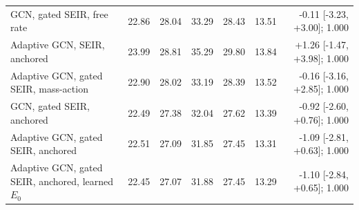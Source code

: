 \begin{table}[t]
\begin{tabular}{@{}p{2.5in}rrrrrr@{}}
GCN, gated SEIR, free rate & 22.86 & 28.04 & 33.29 & 28.43 & 13.51 & -0.11 [-3.23, +3.00]; 1.000 \\ %

Adaptive GCN, SEIR, anchored & 23.99 & 28.81 & 35.29 & 29.80 & 13.84 & +1.26 [-1.47, +3.98]; 1.000 \\ %

Adaptive GCN, gated SEIR, mass-action & 22.90 & 28.02 & 33.19 & 28.39 & 13.52 & -0.16 [-3.16, +2.85]; 1.000 \\ %

GCN, gated SEIR, anchored & 22.49 & 27.38 & 32.04 & 27.62 & 13.39 & -0.92 [-2.60, +0.76]; 1.000 \\ %

Adaptive GCN, gated SEIR, anchored & 22.51 & 27.09 & 31.85 & 27.45 & 13.31 & -1.09 [-2.81, +0.63]; 1.000 \\ %

Adaptive GCN, gated SEIR, anchored, learned $E_0$ & 22.45 & 27.07 & 31.88 & 27.45 & 13.29 & -1.10 [-2.84, +0.65]; 1.000 \\ %

\bottomrule
\end{tabular}
\end{table}
